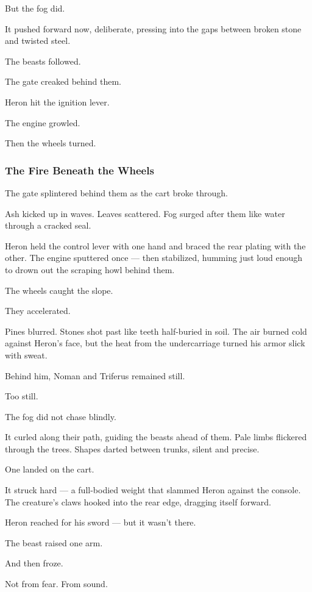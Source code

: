 \documentclass[12pt]{article}
\begin{document}
But the fog did.

It pushed forward now, deliberate, pressing into the gaps between broken stone and twisted steel.

The beasts followed.

The gate creaked behind them.

Heron hit the ignition lever.

The engine growled.

Then the wheels turned.


\dotfill

\subsubsection{The Fire Beneath the Wheels}

The gate splintered behind them as the cart broke through.

Ash kicked up in waves. Leaves scattered. Fog surged after them like water through a cracked seal.

Heron held the control lever with one hand and braced the rear plating with the other. The engine sputtered once — then stabilized, humming just loud enough to drown out the scraping howl behind them.

The wheels caught the slope.

They accelerated.

Pines blurred. Stones shot past like teeth half-buried in soil. The air burned cold against Heron’s face, but the heat from the undercarriage turned his armor slick with sweat.

Behind him, Noman and Triferus remained still.

Too still.

\bigskip

The fog did not chase blindly.

It curled along their path, guiding the beasts ahead of them. Pale limbs flickered through the trees. Shapes darted between trunks, silent and precise.

One landed on the cart.

It struck hard — a full-bodied weight that slammed Heron against the console. The creature’s claws hooked into the rear edge, dragging itself forward.

Heron reached for his sword — but it wasn’t there.

The beast raised one arm.

And then froze.

Not from fear. From sound.
\end{document}
